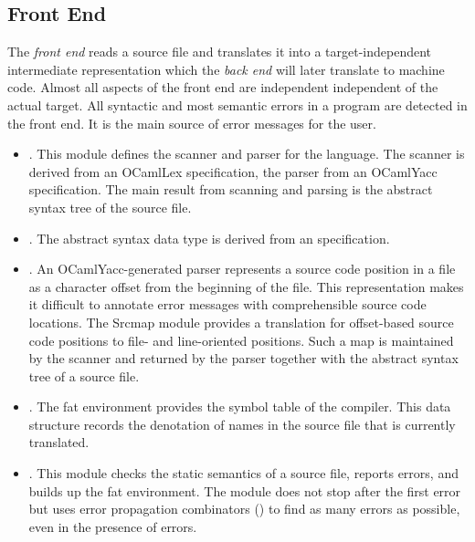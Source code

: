 \documentclass{article}%
\begin{document}
\subsection{Front End}

The \emph{front end} reads a {\PAL} source file and translates it into a
target-independent intermediate representation which the \emph{back end}
will later translate to machine code. Almost all aspects of the front
end are independent independent of the actual target. All syntactic and
most semantic errors in a {\PAL} program are detected in the front end.
It is the main source of error messages for the user.

\begin{itemize}
\item {}. This module defines the scanner and
parser for the {\PAL} language. The scanner is derived from an OCamlLex
specification, the parser from an OCamlYacc specification. The main
result from scanning and parsing is the abstract syntax tree of the
source file.

\item {}. The abstract syntax data type is derived
from an {\asdl} specification.

\item {}. An OCamlYacc-generated parser represents
a source code position in a file as a character offset from the
beginning of the file. This representation makes it difficult to
annotate error messages with comprehensible source code locations. The
{\Tt{}Srcmap\nwendquote} module provides a translation for offset-based source code
positions to file- and line-oriented positions. Such a map is maintained
by the scanner and returned by the parser together with the abstract
syntax tree of a source file.

\item {}. The fat environment provides the symbol
table of the compiler. This data structure records the denotation of
names in the {\PAL} source file that is currently translated.

\item {}. This module checks the static semantics of a
source file, reports errors, and builds up the fat environment. The
module does not stop after the first error but uses error propagation
combinators () to find as many errors as possible,
even in the presence of errors. 


\end{itemize}
\end{document}
